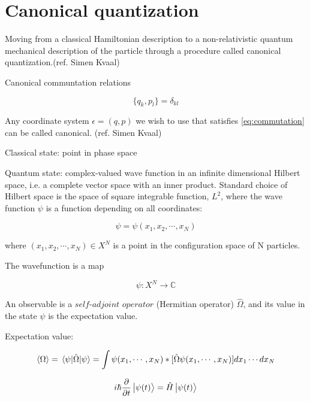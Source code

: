 \section{Canonical quantization}

Moving from a classical Hamiltonian description to a non-relativistic quantum mechanical description of the particle through a procedure called canonical quantization.(ref. Simen Kvaal)

Canonical communtation relations 

\begin{equation} \label{eq:commutation}
\{q_k, p_l\} = \delta_{kl}
\end{equation}

Any coordinate system $\epsilon = (q,p)$ we wish to use that satisfies \ref{eq:commutation} can be called canonical. (ref. Simen Kvaal)

Classical state: point in phase space

Quantum state: complex-valued wave function in an infinite dimensional Hilbert space, i.e. a complete vector space with an inner product.
Standard choice of Hilbert space is the space of square integrable function, $L^2$, where the wave function $\psi$ is a function depending on all coordinates:

\begin{equation}
\psi = \psi (x_1, x_2, \cdots, x_N)
\end{equation}

where $(x_1, x_2, \cdots , x_N) \in X^N$ is a point in the configuration space of N particles. 

The wavefunction is a map 

\begin{equation}
\psi : X^N \longrightarrow \mathbb{C}
\end{equation}

An observable is a $\textit{self-adjoint operator}$ (Hermitian operator) $\hat{\Omega}$, and its value in the state $\psi$ is the expectation value. 

Expectation value: 

\begin{equation}
\expval{\Omega} = \expval{\hat{\Omega}}{\psi} = \int \psi (x_1, \cdots , x_N)\ast [\hat{\Omega} \psi (x_1, \cdots, x_N)] dx_1 \cdots dx_N
\end{equation}

\begin{equation}
i \hbar \frac{\partial}{\partial t} \ket{\psi(t)} = \hat{H} \ket{\psi(t)}
\end{equation}

